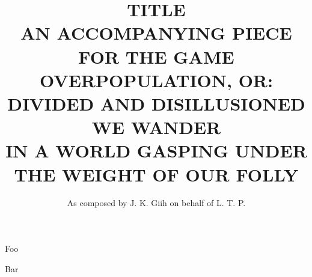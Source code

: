 \documentclass[12pt]{article}
\title{TITLE \\ \vspace{4 mm} {\normalsize AN ACCOMPANYING PIECE FOR THE GAME OVERPOPULATION, OR: \\[1 mm] DIVIDED AND DISILLUSIONED WE WANDER \\[-3 mm] IN A WORLD GASPING UNDER THE WEIGHT OF OUR FOLLY}}
\author{As composed by J. K. Giih on behalf of L. T. P.}
\date{}
\begin{document}
\maketitle
\thispagestyle{empty}
\onehalfspacing
\section{}Foo

Bar
\end{document}

